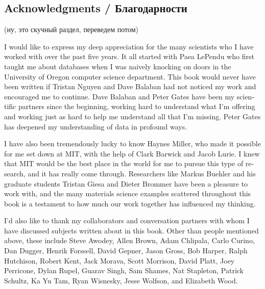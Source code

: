 \documentclass[a4paper]{book}
\theoremstyle{myth}
\begin{document}
\begin{english}

\section{Acknowledgments / Благодарности}

\begin{russian} (ну, это скучный раздел, переведем потом) \end{russian}

I would like to express my deep appreciation for the many scientists who I have worked with over the past five years. It all started with Paea LePendu who first taught me about databases when I was naively knocking on doors in the University of Oregon computer science department. This book would never have been written if Tristan Nguyen and Dave Balaban had not noticed my work and encouraged me to continue. Dave Balaban and Peter Gates have been my scientific partners since the beginning, working hard to understand what I'm offering and working just as hard to help me understand all that I'm missing. Peter Gates has deepened my understanding of data in profound ways.

\begin{russian} \end{russian}

I have also been tremendously lucky to know Haynes Miller, who made it possible for me set down at MIT, with the help of Clark Barwick and Jacob Lurie. I knew that MIT would be the best place in the world for me to pursue this type of research, and it has really come through. Researchers like Markus Buehler and his graduate students Tristan Giesa and Dieter Brommer have been a pleasure to work with, and the many materials science examples scattered throughout this book is a testament to how much our work together has influenced my thinking.

\begin{russian} \end{russian}

I'd also like to thank my collaborators and conversation partners with whom I have discussed subjects written about in this book. Other than people mentioned above, these include Steve Awodey, Allen Brown, Adam Chlipala, Carlo Curino, Dan Dugger, Henrik Forssell, David Gepner, Jason Gross, Bob Harper, Ralph Hutchison, Robert Kent, Jack Morava, Scott Morrison, David Platt, Joey Perricone, Dylan Rupel, Guarav Singh, Sam Shames, Nat Stapleton, Patrick Schultz, Ka Yu Tam, Ryan Wisnesky, Jesse Wolfson, and Elizabeth Wood.


\end{english}
\end{document}
